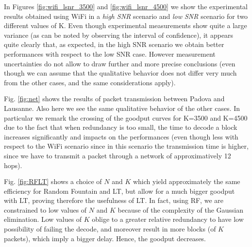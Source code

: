 In Figures \ref{fig:wifi_lsnr_3500} and \ref{fig:wifi_lsnr_4500} we show the experimental results obtained using WiFi in a \textit{high SNR} scenario and \textit{low SNR} scenario for two different values of K. Even though experimental measurements show quite a large variance (as can be noted by observing the interval of confidence), it appears quite clearly that, as expected, in the high SNR scenario we obtain better performances with respect to the low SNR case. However measurement uncertainties do not allow to draw further and more precise conclusions (even though we can assume that the qualitative behavior does not differ very much from the other cases, and the same considerations apply).

Fig. \ref{fig:net} shows the results of packet transmission between Padova and Lausanne. Also here we see the same qualitative behavior of the other cases. In particular we remark the crossing of the goodput curves for K=3500 and K=4500 due to the fact that when redundancy is too small, the time to decode a block increases significantly and impacts on the performances (even though less with respect to the WiFi scenario since in this scenario the transmission time is higher, since we have to transmit a packet through a network of approximatively 12 hops).


Fig. \ref{fig:RFLT} shows a choice of $N$ and $K$ which yield approximately the same efficiency for Random Fountain and LT, but allow for a much bigger goodput with LT, proving therefore the usefulness of LT. In fact, using RF, we are constrained to low values of $N$ and $K$ because of the complexity of the Gaussian elimination. Low values of $K$ oblige to a greater relative redundancy to have low possibility of failing the decode, and moreover result in more blocks (of $K$ packets), which imply a bigger delay. Hence, the goodput decreases.
